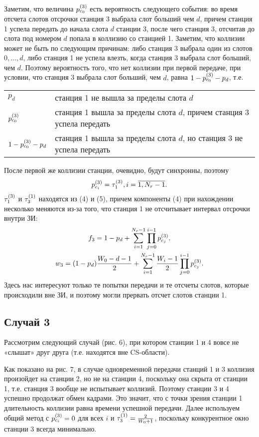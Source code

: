 {Заметим, что величина $p_{c_{0}}^{(3)}$ есть вероятность следующего события: во время отсчета слотов отсрочки станция 3 выбрала слот больший чем $d$, причем станция 1 успела передать до начала слота $d$ станции 3, после чего станция 3, отсчитав до слота под номером $d$ попала в коллизию со станцией 1. Заметим, что коллизии может не быть по следующим причинам: либо станция 3 выбрала один из слотов $0, \dots, d$, либо станция 1 не успела влезть, когда станция 3 выбрала слот больший, чем $d$. Поэтому вероятность того, что нет коллизии при первой передаче, при условии, что станция 3 выбрала слот больший, чем $d$, равна $1 -p_{c_{0}}^{(3)} - p_d$, т.е.

\begin{tabular}{l l}
$p_d$ 		&станция 1 не вышла за пределы слота $d$ \\
$p_{c_{0}}^{(3)}$	&станция 1 вышла за пределы слота $d$, причем станция 3 успела передать \\
$1-p_{c_{0}}^{(3)}-p_d$ &станция 1 вышла за пределы слота $d$, но станция 3 не успела передать \\
\end{tabular}

После первой же коллизии станции, очевидно, будут синхронны, поэтому
\begin{equation}
\notag
p_{c_{i}}^{(3)} = \tau_{1}^{(3)}, i = \overline{1,N_r-1}.
\end{equation}
$\tau_{1}^{(3)}$ и $\tau_{3}^{(1)}$ находятся из (4) и (5), причем компоненты (4) при нахождении  несколько меняются из-за того, что станция 1 не отсчитывает интервал отсрочки внутри ЗИ:
\begin{gather}
\notag
f_3 = 1 - p_d + \sum\limits_{i=1}^{N_r-1}\prod\limits_{j=0}^{i-1}p_{c_{j}}^{(3)}, \\
\notag
w_3 = (1-p_d)\frac{W_0-d-1}{2} + \sum\limits_{i=1}^{N_r-1}\frac{W_i-1}{2}\prod\limits_{j=0}^{i-1}p_{c_{j}}^{(3)}.
\end{gather}
Здесь нас интересуют только те попытки передачи и те  отсчеты слотов, которые происходили вне ЗИ, и поэтому могли прервать отсчет слотов станции 1.

\subsection{Случай 3}
Рассмотрим следующий случай (рис. 6), при котором станции 1 и 4 вовсе не «слышат» друг друга (т.е. находятся вне CS-области).

Как показано на рис. 7, в случае одновременной передачи станций 1 и 3 коллизия произойдет на станции 2, но не на станции 4, поскольку она скрыта от станции 1, т.е. станция 3 вообще не испытывает коллизий. Поэтому станции 3 и 4 успешно продолжат обмен кадрами. Это значит, что с точки зрения станции 1 длительность коллизии равна времени  успешной передачи.  Далее используем общий метод с $p_{c_{i}}^{(3)} = 0$ для всех $i$ и $\tau_{3}^{(1)}=\frac{2}{W_0+1}$, поскольку конкурентное окно станции 3 всегда минимально.


}
